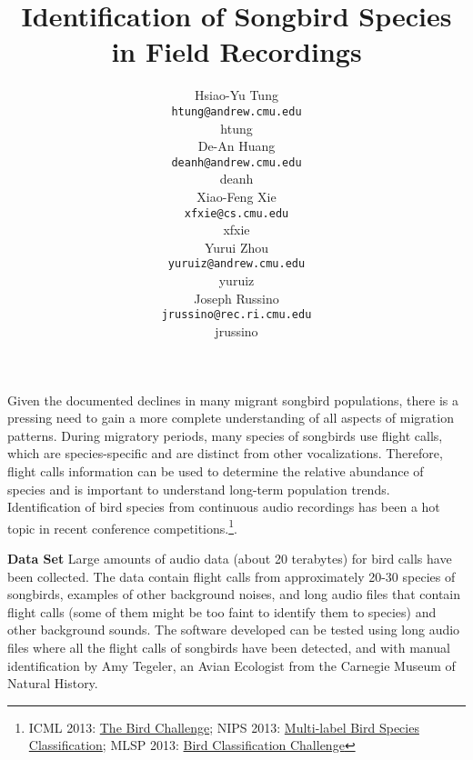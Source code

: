 \documentclass{article} %
\title{Identification of Songbird Species in Field Recordings
}
\author{
Hsiao-Yu Tung \\
\texttt{htung@andrew.cmu.edu} \\
htung \\
\And
De-An Huang \\
\texttt{deanh@andrew.cmu.edu} \\
deanh \\
\And
Xiao-Feng Xie \\
\texttt{xfxie@cs.cmu.edu} \\
xfxie \\
\And
Yurui Zhou\\
\texttt{yuruiz@andrew.cmu.edu}\\
yuruiz \\
\And
Joseph Russino\\
\texttt{jrussino@rec.ri.cmu.edu}\\
jrussino \\
}
\begin{document}
\maketitle


Given the documented declines in many migrant songbird populations, there is a pressing need to gain a more complete understanding of all aspects of migration patterns.
During migratory periods, many species of songbirds use flight calls, which are species-specific and are distinct from other vocalizations. Therefore, flight calls information can be used to determine the relative abundance of species and is important to understand long-term population trends. Identification of bird species from continuous audio recordings has been a hot topic in recent conference competitions.\footnote{\scriptsize ICML 2013: \href{http://www.kaggle.com/c/the-icml-2013-bird-challenge}{The Bird Challenge}; NIPS 2013: \href{http://www.kaggle.com/c/multilabel-bird-species-classification-nips2013}{
Multi-label Bird Species Classification}; MLSP 2013: \href{http://www.kaggle.com/c/mlsp-2013-birds}{Bird Classification Challenge}}.


{\bf Data Set} Large amounts of audio data (about 20 terabytes) for bird calls have been collected. The data contain flight calls from approximately 20-30 species of songbirds, examples of other background noises, and long audio files that contain flight calls (some of them might be too faint to identify them to species) and other background sounds. The software developed can be tested using long audio files where all the flight calls of songbirds have been detected, and with manual identification by Amy Tegeler, an Avian Ecologist from the Carnegie Museum of Natural History.
\end{document}
